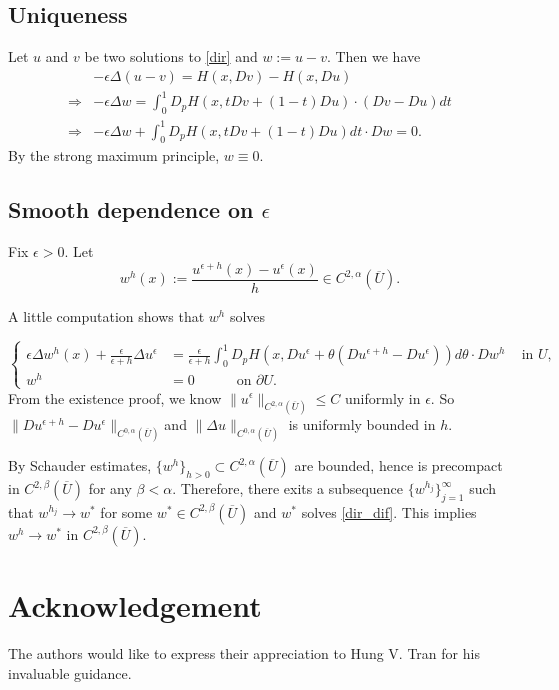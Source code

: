 \documentclass[11pt,reqno]{amsart}
\numberwithin{figure}{section}
\theoremstyle{plain}
\theoremstyle{remark}
\numberwithin{equation}{section}
\begin{document}
\begin{appendices}
\subsection{Uniqueness}
Let $u$ and $v$ be two solutions to \eqref{dir} and $w := u-v$. Then we have
\begin{equation}
\begin{aligned}
    &-\epsilon \Delta (u-v) = H(x, Dv)-H(x, Du)\\
    \Rightarrow &-\epsilon \Delta w   =\int_0^1 D_pH(x, tDv+(1-t)Du) \cdot (Dv-Du)dt\\
    \Rightarrow &-\epsilon \Delta w  +\int_0^1 D_pH(x, tDv+(1-t)Du)dt \cdot Dw = 0.
\end{aligned}
\end{equation}
By the strong maximum principle, $w \equiv 0$.



\subsection{Smooth dependence on $\epsilon$}
Fix $\epsilon >0$. Let  $$w^h(x):=\frac{u^{\epsilon+h}(x)-u^\epsilon(x)}{h} \in C^{2,\alpha}(\overline{U}).$$

A little computation shows that $w^h$ solves

\begin{equation}
\label{dir_quo}
\left\{
  \begin{aligned}
   \epsilon \Delta w^h(x) + \frac{\epsilon}{\epsilon + h}\Delta u^\epsilon &= \frac{\epsilon}{\epsilon +h} \int_0^1 D_pH(x, Du^\epsilon+\theta (Du^{\epsilon+h}-Du^\epsilon)) d\theta \cdot Dw^h \quad \, \text{in } U, \\
              w^h &= 0 \quad \qquad \text{on } \partial U.
  \end{aligned}
\right.
\end{equation}
From the existence proof, we know $\|u^\epsilon\|_{C^{2,\alpha}(\overline{U})} \leq C$ uniformly in $\epsilon$. So $\|Du^{\epsilon+h}-Du^\epsilon\|_{C^{0,\alpha}(\overline{U})}$and $\|\Delta u\|_{C^{0,\alpha}(\overline{U})}
$ is uniformly bounded in $h$.  

By Schauder estimates, $\{w^h\}_{h>0} \subset C^{2, \alpha}(\overline{U})$ are bounded, hence is precompact in $ C^{2, \beta}(\overline{U})$ for any $\beta < \alpha$. Therefore, there exits a subsequence $\{w^{h_j}\}_{j=1}^\infty$ such that $w^{h_j} \to w^\ast$ for some $w^\ast \in  C^{2, \beta}(\overline{U}) $ and $w^\ast$ solves \eqref{dir_dif}. This implies $w^h \to w^\ast$ in $C^{2, \beta}(\overline{U})$.
\end{appendices}

\section*{Acknowledgement}
The authors would like to express their appreciation to Hung V. Tran for his invaluable guidance.



{}
%

\end{document}
